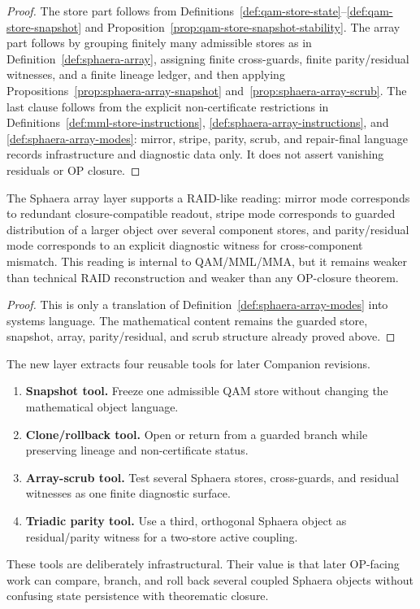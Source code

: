 \begin{proof}
The store part follows from Definitions~\ref{def:qam-store-state}--\ref{def:qam-store-snapshot} and Proposition~\ref{prop:qam-store-snapshot-stability}. The array part follows by grouping finitely many admissible stores as in Definition~\ref{def:sphaera-array}, assigning finite cross-guards, finite parity/residual witnesses, and a finite lineage ledger, and then applying Propositions~\ref{prop:sphaera-array-snapshot} and~\ref{prop:sphaera-array-scrub}. The last clause follows from the explicit non-certificate restrictions in Definitions~\ref{def:mml-store-instructions}, \ref{def:sphaera-array-instructions}, and \ref{def:sphaera-array-modes}: mirror, stripe, parity, scrub, and repair-final language records infrastructure and diagnostic data only. It does not assert vanishing residuals or OP closure.
\end{proof}

\begin{corollary}\label{cor:sphaera-array-raid-reading}
The Sphaera array layer supports a RAID-like reading: mirror mode corresponds to redundant closure-compatible readout, stripe mode corresponds to guarded distribution of a larger object over several component stores, and parity/residual mode corresponds to an explicit diagnostic witness for cross-component mismatch. This reading is internal to QAM/MML/MMA, but it remains weaker than technical RAID reconstruction and weaker than any OP-closure theorem.
\end{corollary}

\begin{proof}
This is only a translation of Definition~\ref{def:sphaera-array-modes} into systems language. The mathematical content remains the guarded store, snapshot, array, parity/residual, and scrub structure already proved above.
\end{proof}

\begin{remark}\label{rem:sphaera-array-tool-extraction}
The new layer extracts four reusable tools for later Companion revisions.
\begin{enumerate}[leftmargin=2em]
 \item \textbf{Snapshot tool.} Freeze one admissible QAM store without changing the mathematical object language.
 \item \textbf{Clone/rollback tool.} Open or return from a guarded branch while preserving lineage and non-certificate status.
 \item \textbf{Array-scrub tool.} Test several Sphaera stores, cross-guards, and residual witnesses as one finite diagnostic surface.
 \item \textbf{Triadic parity tool.} Use a third, orthogonal Sphaera object as residual/parity witness for a two-store active coupling.
\end{enumerate}
These tools are deliberately infrastructural. Their value is that later OP-facing work can compare, branch, and roll back several coupled Sphaera objects without confusing state persistence with theorematic closure.
\end{remark}

